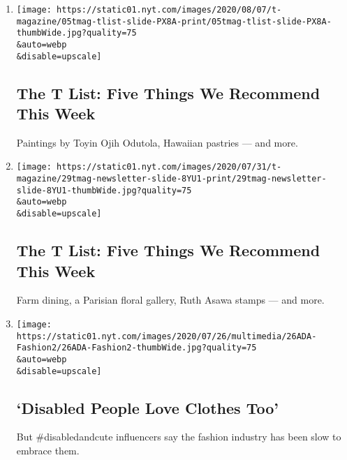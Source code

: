 \begin{enumerate}
\def\labelenumi{\arabic{enumi}.}
\item
  \href{/2020/08/06/t-magazine/t-list-toyin-ojih-odutola.html}{}

  \texttt{[image: https://static01.nyt.com/images/2020/08/07/t-magazine/05tmag-tlist-slide-PX8A-print/05tmag-tlist-slide-PX8A-thumbWide.jpg?quality=75\\\&auto=webp\\\&disable=upscale]}

  \hypertarget{the-t-list-five-things-we-recommend-this-week}{%
  \subsection{The T List: Five Things We Recommend This
  Week}\label{the-t-list-five-things-we-recommend-this-week}}

  Paintings by Toyin Ojih Odutola, Hawaiian pastries --- and more.
\item
  \href{/2020/07/30/t-magazine/the-t-list-five-things-we-recommend-this-week.html}{}

  \texttt{[image: https://static01.nyt.com/images/2020/07/31/t-magazine/29tmag-newsletter-slide-8YU1-print/29tmag-newsletter-slide-8YU1-thumbWide.jpg?quality=75\\\&auto=webp\\\&disable=upscale]}

  \hypertarget{the-t-list-five-things-we-recommend-this-week-1}{%
  \subsection{The T List: Five Things We Recommend This
  Week}\label{the-t-list-five-things-we-recommend-this-week-1}}

  Farm dining, a Parisian floral gallery, Ruth Asawa stamps --- and
  more.
\item
  \href{/2020/07/26/style/functional-fashion.html}{}

  \texttt{[image: https://static01.nyt.com/images/2020/07/26/multimedia/26ADA-Fashion2/26ADA-Fashion2-thumbWide.jpg?quality=75\\\&auto=webp\\\&disable=upscale]}

  \hypertarget{disabled-people-love-clothes-too}{%
  \subsection{`Disabled People Love Clothes
  Too'}\label{disabled-people-love-clothes-too}}

  But \#disabledandcute influencers say the fashion industry has been
  slow to embrace them.


\end{enumerate}
